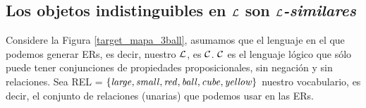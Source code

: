 \subsection{Los objetos indistinguibles en $\mathcal{L}$ son \emph{$\mathcal{L}$-similares}}
\label{sec:indistinguibles}

Considere la Figura \ref{target_mapa_3ball}, asumamos que el lenguaje en el que podemos generar ERs, es decir, nuestro $\mathcal{L}$, es $\mathcal{C}$. $\mathcal{C}$ es el lenguaje l\'ogico
que s\'olo puede tener conjunciones de propiedades proposicionales, 
sin negaci\'on y sin relaciones. Sea REL = $\{\mathit{large}, \mathit{small}, \mathit{red}, \mathit{ball}, \mathit{cube}, \mathit{yellow} \}$ nuestro vocabulario, es decir, el conjunto de relaciones (unarias) que podemos usar en las ERs.


